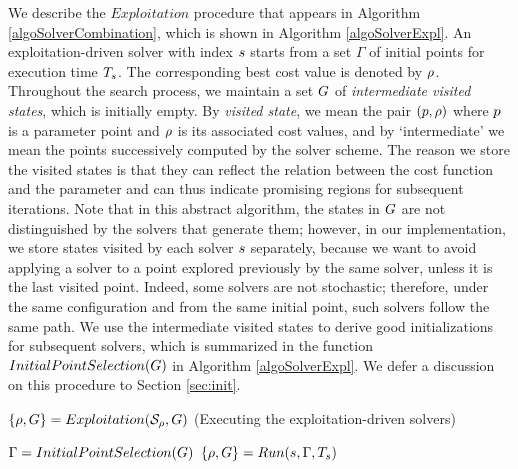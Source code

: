 We describe the $Exploitation$ procedure that appears in Algorithm \ref{algoSolverCombination}, which is shown in Algorithm \ref{algoSolverExpl}. 
An exploitation-driven solver with index $s$ starts from a set $\Gamma$ of initial points for execution time $T_{s}$. The corresponding best cost value is denoted by $\rho$. Throughout the search process, we maintain a set $G$ of {\em intermediate visited states}, which is initially empty. By {\em visited state}, we mean the pair $(p, \rho)$ where $p$ is a parameter point and $\rho$ is its associated cost values, and by `intermediate' we mean the points successively computed by the solver scheme. The reason we store the visited states is that they can reflect the relation between the cost function and the parameter and can thus indicate promising regions for subsequent iterations. Note that in this abstract algorithm, the states in $G$ are not distinguished by the solvers that generate them; however, in our implementation, we store states visited by each solver $s$ separately, because we want to avoid applying a solver to a point explored previously by the same solver, unless it is the last visited point. Indeed, some solvers are not stochastic; therefore, under the same configuration and from the same initial point, such solvers follow the same path. We use the intermediate visited states to derive good initializations for subsequent solvers, which is summarized in the function $InitialPointSelection(G)$ in Algorithm \ref{algoSolverExpl}. We defer a discussion on this procedure to Section \ref{sec:init}.

\begin{algorithm}
\caption{$\{ \rho, G \}=Exploitation(\mathcal{S_{\rho}}, G)$ 
(Executing the exploitation-driven solvers) \label{algoSolverExpl}}
\begin{algorithmic}
		\State {}
		\ForAll{$\solver \in \solversetRho$} 
		\State $\Gamma = InitialPointSelection(G)$
		\State {}
  		\State $\{ \rho, G \} = Run(s, \Gamma, T_{s})$ 
		\EndFor
\end{algorithmic}
\end{algorithm}


